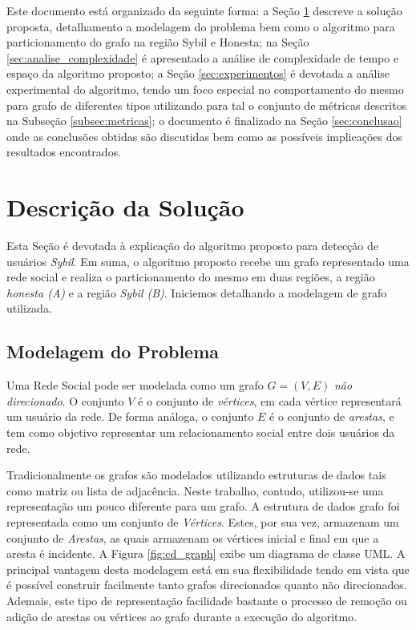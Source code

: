 \documentclass[12pt]{article}
\begin{document}
Este documento está organizado da seguinte forma: a Seção \ref{sec:solucao} descreve a solução proposta, detalhamento a modelagem do problema bem como o algoritmo para particionamento do grafo na região Sybil e Honesta; na Seção \ref{sec:analise_complexidade} é apresentado a análise de complexidade de tempo e espaço da algoritmo proposto; a Seção \ref{sec:experimentos} é devotada a análise experimental do algoritmo, tendo um foco especial no comportamento do mesmo para grafo de diferentes tipos utilizando para tal o conjunto de métricas descritos na Subseção \ref{subsec:metricas}; o documento é finalizado na Seção \ref{sec:conclusao} onde as conclusões obtidas são discutidas bem como as possíveis implicações dos resultados encontrados.

\section{Descrição da Solução}
\label{sec:solucao}
Esta Seção é devotada à explicação do algoritmo proposto para detecção de usuários \textit{Sybil}. Em suma, o algoritmo proposto recebe um grafo representado uma rede social e realiza o particionamento do mesmo em duas regiões, a região \emph{honesta (A)} e a região \emph{Sybil (B)}. Iniciemos detalhando a modelagem de grafo utilizada.

\subsection{Modelagem do Problema}
\label{subsec:modelagem}

Uma Rede Social pode ser modelada como um grafo $G = (V, E)$ \emph{não direcionado}. O conjunto $V$ é o conjunto de \textit{vértices}, em cada vértice representará um usuário da rede. De forma análoga, o conjunto $E$ é o conjunto de \textit{arestas}, e tem como objetivo representar um relacionamento social entre dois usuários da rede.

Tradicionalmente os grafos são modelados utilizando estruturas de dados tais como matriz ou lista de adjacência. Neste trabalho, contudo, utilizou-se uma representação um pouco diferente para um grafo. A estrutura de dados grafo foi representada como um conjunto de \textit{Vértices}. Estes, por sua vez, armazenam um conjunto de \textit{Arestas}, as quais armazenam os vértices inicial e final em que a aresta é incidente. A Figura \ref{fig:cd_graph} exibe um diagrama de classe UML\cite{rumbaugh2004unified}{}. A principal vantagem desta modelagem está em sua flexibilidade tendo em vista que é possível construir facilmente tanto grafos direcionados quanto não direcionados. Ademais, este tipo de representação facilidade bastante o processo de remoção ou adição de arestas ou vértices ao grafo durante a execução do algoritmo.
\end{document}
